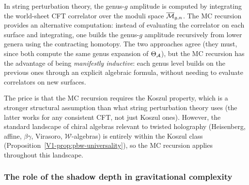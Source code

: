 \begin{remark}
In string perturbation theory, the genus-$g$ amplitude is
computed by integrating the world-sheet CFT correlator over
the moduli space $\overline{\mathcal{M}}_{g,n}$. The MC recursion
provides an alternative computation: instead of evaluating the
correlator on each surface and integrating, one builds the
genus-$g$ amplitude recursively from lower genera using the
contracting homotopy. The two approaches agree (they must,
since both compute the same genus expansion of $\Theta_{\mathcal{A}}$),
but the MC recursion has the advantage of being
\emph{manifestly inductive}: each genus level builds on the
previous ones through an explicit algebraic formula, without
needing to evaluate correlators on new surfaces.

The price is that the MC recursion requires the Koszul
property, which is a stronger structural assumption than what
string perturbation theory uses (the latter works for any
consistent CFT, not just Koszul ones). However, the standard
landscape of chiral algebras relevant to twisted holography
(Heisenberg, affine, $\beta\gamma$, Virasoro, $\mathcal{W}$-algebras)
is entirely within the Koszul class
(Proposition~\ref{V1-prop:pbw-universality}), so the MC recursion
applies throughout this landscape.
\end{remark}

\subsubsection{The role of the shadow depth in gravitational
complexity}

